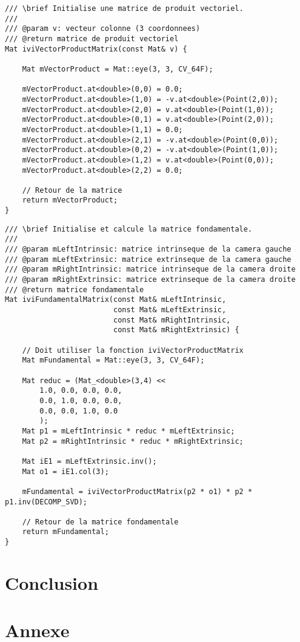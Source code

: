 \documentclass[a4paper,11pt]{article}
\begin{document}
\begin{lstlisting}[caption=Fontion qui calcul le produit vectoriel]
/// \brief Initialise une matrice de produit vectoriel.
///
/// @param v: vecteur colonne (3 coordonnees)
/// @return matrice de produit vectoriel
Mat iviVectorProductMatrix(const Mat& v) {

    Mat mVectorProduct = Mat::eye(3, 3, CV_64F);

    mVectorProduct.at<double>(0,0) = 0.0;
    mVectorProduct.at<double>(1,0) = -v.at<double>(Point(2,0));
    mVectorProduct.at<double>(2,0) = v.at<double>(Point(1,0));
    mVectorProduct.at<double>(0,1) = v.at<double>(Point(2,0));
    mVectorProduct.at<double>(1,1) = 0.0;
    mVectorProduct.at<double>(2,1) = -v.at<double>(Point(0,0));
    mVectorProduct.at<double>(0,2) = -v.at<double>(Point(1,0));
    mVectorProduct.at<double>(1,2) = v.at<double>(Point(0,0));
    mVectorProduct.at<double>(2,2) = 0.0;

    // Retour de la matrice
    return mVectorProduct;
}
\end{lstlisting}

\begin{lstlisting}[caption=Fontion qui calcul la matrice fondamentale]
/// \brief Initialise et calcule la matrice fondamentale.
///
/// @param mLeftIntrinsic: matrice intrinseque de la camera gauche
/// @param mLeftExtrinsic: matrice extrinseque de la camera gauche
/// @param mRightIntrinsic: matrice intrinseque de la camera droite
/// @param mRightExtrinsic: matrice extrinseque de la camera droite
/// @return matrice fondamentale
Mat iviFundamentalMatrix(const Mat& mLeftIntrinsic,
                         const Mat& mLeftExtrinsic,
                         const Mat& mRightIntrinsic,
                         const Mat& mRightExtrinsic) {

    // Doit utiliser la fonction iviVectorProductMatrix
    Mat mFundamental = Mat::eye(3, 3, CV_64F);

    Mat reduc = (Mat_<double>(3,4) <<
        1.0, 0.0, 0.0, 0.0,
        0.0, 1.0, 0.0, 0.0,
        0.0, 0.0, 1.0, 0.0
        );
    Mat p1 = mLeftIntrinsic * reduc * mLeftExtrinsic;
    Mat p2 = mRightIntrinsic * reduc * mRightExtrinsic;

    Mat iE1 = mLeftExtrinsic.inv();
    Mat o1 = iE1.col(3);

    mFundamental = iviVectorProductMatrix(p2 * o1) * p2 * p1.inv(DECOMP_SVD);

    // Retour de la matrice fondamentale
    return mFundamental;
}
\end{lstlisting}



\section{Conclusion}



\section{Annexe}
\end{document}

